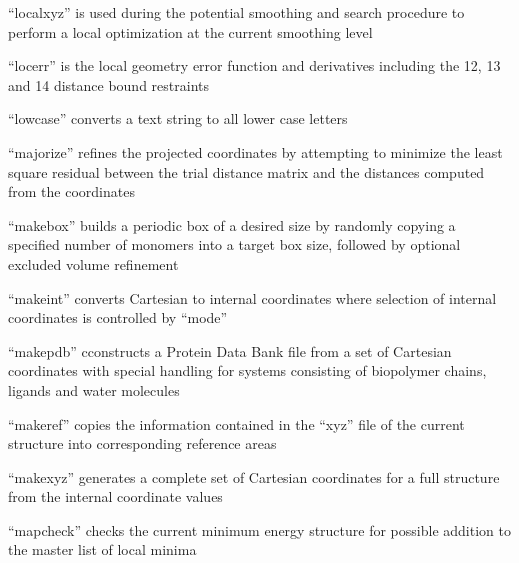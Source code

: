 \documentclass[letterpaper,11pt,english]{sphinxmanual}
\begin{document}

“localxyz” is used during the potential smoothing and search
procedure to perform a local optimization at the current
smoothing level


“locerr” is the local geometry error function and derivatives
including the 1\sphinxhyphen{}2, 1\sphinxhyphen{}3 and 1\sphinxhyphen{}4 distance bound restraints


“lowcase” converts a text string to all lower case letters


“majorize” refines the projected coordinates by attempting to
minimize the least square residual between the trial distance
matrix and the distances computed from the coordinates



“makebox” builds a periodic box of a desired size by randomly
copying a specified number of monomers into a target box size,
followed by optional excluded volume refinement


“makeint” converts Cartesian to internal coordinates where
selection of internal coordinates is controlled by “mode”


“makepdb” cconstructs a Protein Data Bank file from a set
of Cartesian coordinates with special handling for systems
consisting of biopolymer chains, ligands and water molecules


“makeref” copies the information contained in the “xyz” file
of the current structure into corresponding reference areas


“makexyz” generates a complete set of Cartesian coordinates
for a full structure from the internal coordinate values


“mapcheck” checks the current minimum energy structure
for possible addition to the master list of local minima
\end{document}
